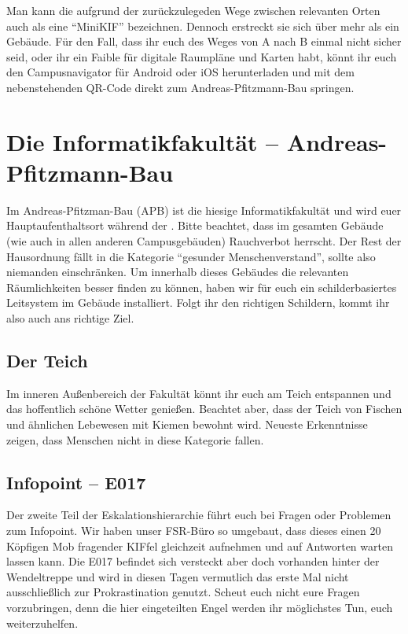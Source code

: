 
\begin{figure}
  \vspace*{-11pt}
  \textcolor{KIFgrey}{}
\end{figure}

Man kann die \KIF{} aufgrund der zurückzulegeden Wege zwischen relevanten Orten auch als eine \enquote{MiniKIF} bezeichnen. Dennoch erstreckt sie sich über mehr als ein Gebäude.
Für den Fall, dass ihr euch des Weges von A nach B einmal nicht sicher seid, oder ihr ein Faible für digitale Raumpläne und Karten habt, könnt ihr euch den Campusnavigator für Android  oder iOS  herunterladen und mit dem nebenstehenden QR-Code direkt zum Andreas-Pfitzmann-Bau springen.

\section*{Die Informatikfakultät -- Andreas-Pfitzmann-Bau}
Im Andreas-Pfitzman-Bau (APB) ist die hiesige Informatikfakultät und wird euer Hauptaufenthaltsort während der \KIF{}.
Bitte beachtet, dass im gesamten Gebäude (wie auch in allen anderen Campusgebäuden) Rauchverbot herrscht.
Der Rest der Hausordnung fällt in die Kategorie \enquote{gesunder Menschenverstand}, sollte also niemanden einschränken.
Um innerhalb dieses Gebäudes die relevanten Räumlichkeiten besser finden zu können, haben wir für euch ein schilderbasiertes Leitsystem im Gebäude installiert.
Folgt ihr den richtigen Schildern, kommt ihr also auch ans richtige Ziel.

\subsection*{Der Teich}
Im inneren Außenbereich der Fakultät könnt ihr euch am Teich entspannen und das hoffentlich schöne Wetter genießen.
Beachtet aber, dass der Teich von Fischen und ähnlichen Lebewesen mit Kiemen bewohnt wird.
Neueste Erkenntnisse zeigen, dass Menschen nicht in diese Kategorie fallen.

\subsection*{Infopoint -- E017}
Der zweite Teil der Eskalationshierarchie führt euch bei Fragen oder Problemen zum Infopoint.
Wir haben unser FSR-Büro so umgebaut, dass dieses einen 20 Köpfigen Mob fragender KIFfel gleichzeit aufnehmen und auf Antworten warten lassen kann.
Die E017 befindet sich versteckt aber doch vorhanden hinter der Wendeltreppe und wird in diesen Tagen vermutlich das erste Mal nicht ausschließlich zur Prokrastination genutzt.
Scheut euch nicht eure Fragen vorzubringen, denn die hier eingeteilten Engel werden ihr möglichstes Tun, euch weiterzuhelfen.


